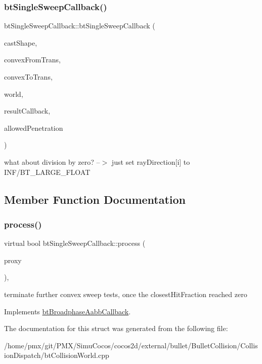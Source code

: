 \subsubsection{\texorpdfstring{bt\+Single\+Sweep\+Callback()}{btSingleSweepCallback()}}
{\footnotesize\ttfamily bt\+Single\+Sweep\+Callback\+::bt\+Single\+Sweep\+Callback (\begin{DoxyParamCaption}\item[{const bt\+Convex\+Shape $\ast$}]{cast\+Shape,  }\item[{const bt\+Transform \&}]{convex\+From\+Trans,  }\item[{const bt\+Transform \&}]{convex\+To\+Trans,  }\item[{const \hyperlink{classbtCollisionWorld}{bt\+Collision\+World} $\ast$}]{world,  }\item[{\hyperlink{structbtCollisionWorld_1_1ConvexResultCallback}{bt\+Collision\+World\+::\+Convex\+Result\+Callback} \&}]{result\+Callback,  }\item[{bt\+Scalar}]{allowed\+Penetration }\end{DoxyParamCaption})\hspace{0.3cm}{\ttfamily [inline]}}

what about division by zero? --$>$ just set ray\+Direction\mbox{[}i\mbox{]} to I\+N\+F/\+B\+T\+\_\+\+L\+A\+R\+G\+E\+\_\+\+F\+L\+O\+AT 

\subsection{Member Function Documentation}
\mbox{\label{structbtSingleSweepCallback_a38b90d239e96c18b3843435976b598fc}} 
\subsubsection{\texorpdfstring{process()}{process()}}
{\footnotesize\ttfamily virtual bool bt\+Single\+Sweep\+Callback\+::process (\begin{DoxyParamCaption}\item[{const bt\+Broadphase\+Proxy $\ast$}]{proxy }\end{DoxyParamCaption})\hspace{0.3cm}{\ttfamily [inline]}, {\ttfamily [virtual]}}

terminate further convex sweep tests, once the closest\+Hit\+Fraction reached zero 

Implements \hyperlink{structbtBroadphaseAabbCallback}{bt\+Broadphase\+Aabb\+Callback}.



The documentation for this struct was generated from the following file\+:\begin{DoxyCompactItemize}
\item 
/home/pmx/git/\+P\+M\+X/\+Simu\+Cocos/cocos2d/external/bullet/\+Bullet\+Collision/\+Collision\+Dispatch/bt\+Collision\+World.\+cpp\end{DoxyCompactItemize}
